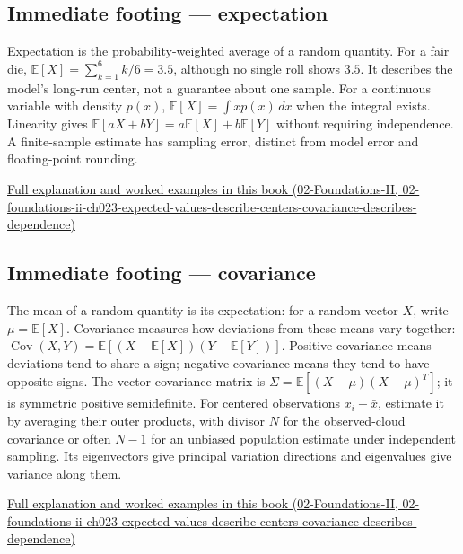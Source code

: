 \subsection{Immediate footing --- expectation}\label{01-foundations-i-ch018-immediate-footing-expectation}

Expectation is the probability-weighted average of a random quantity. For a fair die, \(\mathbb{E}[X]=\sum_{k=1}^6 k/6=3.5\), although no single roll shows \(3.5\). It describes the model's long-run center, not a guarantee about one sample. For a continuous variable with density \(p(x)\), \(\mathbb{E}[X]=\int x p(x)\,dx\) when the integral exists. Linearity gives \(\mathbb{E}[aX+bY]=a\mathbb{E}[X]+b\mathbb{E}[Y]\) without requiring independence. A finite-sample estimate has sampling error, distinct from model error and floating-point rounding.

\href{../02-Foundations-II/main.pdf\#nameddest=02-foundations-ii-ch023-expected-values-describe-centers-covariance-describes-dependence}{Full explanation and worked examples in this book (02-Foundations-II, 02-foundations-ii-ch023-expected-values-describe-centers-covariance-describes-dependence)}

\subsection{Immediate footing --- covariance}\label{01-foundations-i-ch018-immediate-footing-covariance}

The mean of a random quantity is its expectation: for a random vector \(X\), write \(\mu=\mathbb{E}[X]\). Covariance measures how deviations from these means vary together: \(\operatorname{Cov}(X,Y)=\mathbb{E}[(X-\mathbb{E}[X])(Y-\mathbb{E}[Y])]\). Positive covariance means deviations tend to share a sign; negative covariance means they tend to have opposite signs. The vector covariance matrix is \(\Sigma=\mathbb{E}[(X-\mu)(X-\mu)^T]\); it is symmetric positive semidefinite. For centered observations \(x_i-\bar{x}\), estimate it by averaging their outer products, with divisor \(N\) for the observed-cloud covariance or often \(N-1\) for an unbiased population estimate under independent sampling. Its eigenvectors give principal variation directions and eigenvalues give variance along them.

\href{../02-Foundations-II/main.pdf\#nameddest=02-foundations-ii-ch023-expected-values-describe-centers-covariance-describes-dependence}{Full explanation and worked examples in this book (02-Foundations-II, 02-foundations-ii-ch023-expected-values-describe-centers-covariance-describes-dependence)}

